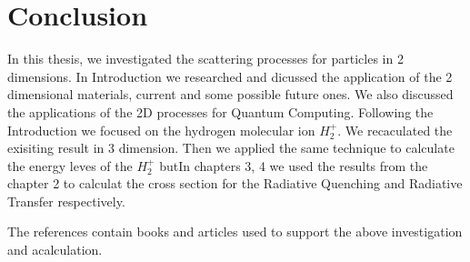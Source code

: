 \chapter{Conclusion}
\label{conclusion}

In this thesis, we investigated the scattering processes for particles in 2 dimensions. In Introduction we researched and dicussed the application of the 2 dimensional materials, current and some possible future ones. We also discussed the applications of the 2D processes for Quantum Computing.
Following the Introduction we focused on the hydrogen molecular ion $ H_2^{+} $. We recaculated the exisiting result in 3 dimension. 
Then we applied the same technique to calculate the energy leves of the $ H_2^{+} $ butIn chapters 3, 4 we used the results from the chapter 2 to calculat the cross section for the Radiative Quenching and Radiative Transfer respectively.

The references contain books and articles used to support the above investigation and acalculation.


